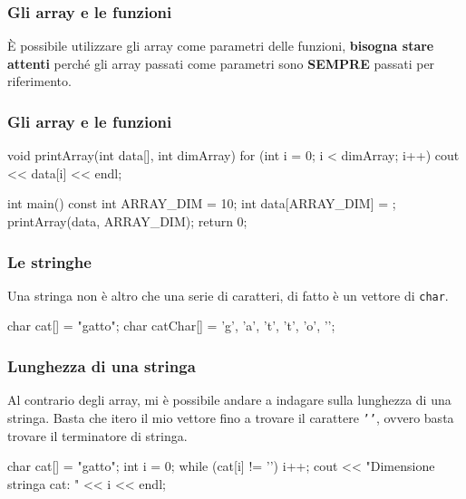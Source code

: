 \documentclass{beamer}
\begin{document}
    \begin{frame}
        \frametitle{Gli array e le funzioni}
    
        È possibile utilizzare gli array come parametri delle funzioni, \textbf{bisogna stare attenti} perché gli array passati come parametri sono \textbf{SEMPRE} passati per riferimento.
    
    \end{frame}

    \begin{frame}[fragile]
        \frametitle{Gli array e le funzioni}
    
        \begin{cppcode}
            void printArray(int data[], int dimArray) {
                for (int i = 0; i < dimArray; i++) {
                    cout << data[i] << endl;
                }
            }

            int main() {
                const int ARRAY_DIM = 10;
                int data[ARRAY_DIM] = {};
                printArray(data, ARRAY_DIM);
                return 0;
            }
        \end{cppcode}
    
    \end{frame}

    \begin{frame}[fragile]
        \frametitle{Le stringhe}

        Una stringa non è altro che una serie di caratteri, di fatto è un vettore di \texttt{char}.
        
        \begin{cppcode}
            char cat[] = "gatto";
            char catChar[] = {'g', 'a', 't', 't', 'o', '\0'};
        \end{cppcode}

    \end{frame}

    \begin{frame}[fragile]
        \frametitle{Lunghezza di una stringa}
    
        Al contrario degli array, mi è possibile andare a indagare sulla lunghezza di una stringa. Basta che itero il mio vettore fino a trovare il carattere \texttt{'\0'}, ovvero basta trovare il terminatore di stringa.
        \begin{cppcode}
            char cat[] = "gatto";
            int i = 0;
            while (cat[i] != '\0') {
                i++;
            }
            cout << "Dimensione stringa cat: " << i << endl;
        \end{cppcode}
    
    \end{frame}
\end{document}
